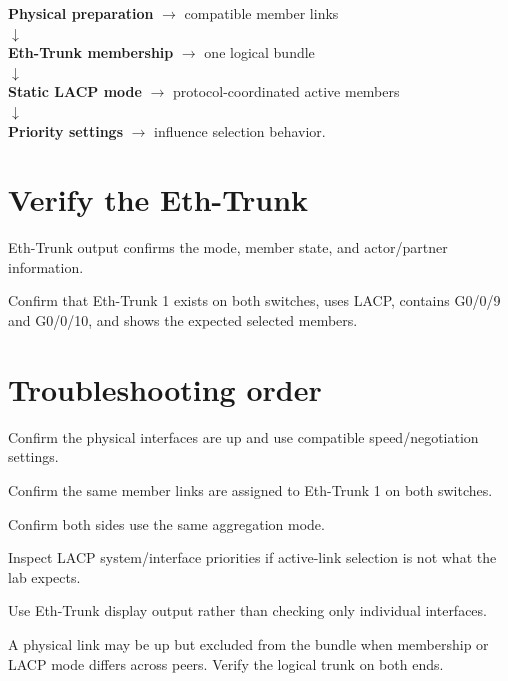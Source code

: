 \begin{conceptmap}
\textbf{Physical preparation} $\rightarrow$ compatible member links\\
$\downarrow$\\
\textbf{Eth-Trunk membership} $\rightarrow$ one logical bundle\\
$\downarrow$\\
\textbf{Static LACP mode} $\rightarrow$ protocol-coordinated active members\\
$\downarrow$\\
\textbf{Priority settings} $\rightarrow$ influence selection behavior.
\end{conceptmap}

\section{Verify the Eth-Trunk}
Eth-Trunk output confirms the mode, member state, and actor/partner information.


\begin{verification}
Confirm that Eth-Trunk 1 exists on both switches, uses LACP, contains G0/0/9 and G0/0/10, and shows the expected selected members.
\end{verification}

\section{Troubleshooting order}
\begin{netsteps}
\item Confirm the physical interfaces are up and use compatible speed/negotiation settings.
\item Confirm the same member links are assigned to Eth-Trunk 1 on both switches.
\item Confirm both sides use the same aggregation mode.
\item Inspect LACP system/interface priorities if active-link selection is not what the lab expects.
\item Use Eth-Trunk display output rather than checking only individual interfaces.
\end{netsteps}

\begin{pitfall}
A physical link may be up but excluded from the bundle when membership or LACP mode differs across peers. Verify the logical trunk on both ends.
\end{pitfall}

